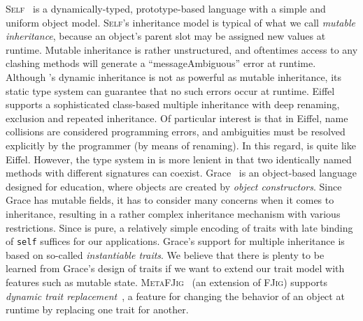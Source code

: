 \textsc{Self}~\citep{ungar1988self} is a dynamically-typed, prototype-based
language with a simple and uniform object model. \textsc{Self}'s inheritance
model is typical of what we call \textit{mutable inheritance}, because an object's parent
slot may be assigned new values at runtime. Mutable inheritance is rather
unstructured, and oftentimes access to any clashing methods will generate a
``messageAmbiguous'' error at runtime. Although \namee's dynamic inheritance is
not as powerful as mutable inheritance, its static type system can guarantee
that no such errors occur at runtime. Eiffel~\citep{meyer1987eiffel} supports a
sophisticated class-based multiple inheritance with deep renaming, exclusion
and repeated inheritance. Of particular interest is that in Eiffel, name
collisions are considered programming errors, and ambiguities must be resolved
explicitly by the programmer (by means of renaming). In this regard, \namee is
quite like Eiffel. However, the type system in \namee is more lenient in that two
identically named methods with different signatures can coexist. Grace~\citep{DBLP:journals/jot/NobleBBHJ17, DBLP:conf/ecoop/0002HNB16}
is an object-based language designed for education, where objects are created by
\textit{object constructors}.
Since Grace has mutable fields, it has to consider
many concerns when it comes to inheritance, resulting in a rather complex
inheritance mechanism with various restrictions.
Since \namee is pure, a relatively simple
encoding of traits with late binding of \lstinline{self}
suffices for our applications. Grace's support for multiple inheritance is
based on so-called \emph{instantiable traits}.
We believe that there is plenty to be learned from
Grace's design of traits if we want to extend our trait model with
features such as mutable state. \textsc{MetaFJig}~\citep{SERVETTO2014219} (an extension of \textsc{FJig})
supports \textit{dynamic trait replacement}~\citep{chai_trait, BETTINI2013907, Ducasse_2006},
a feature for changing the behavior of an object at runtime by replacing one trait for another.




